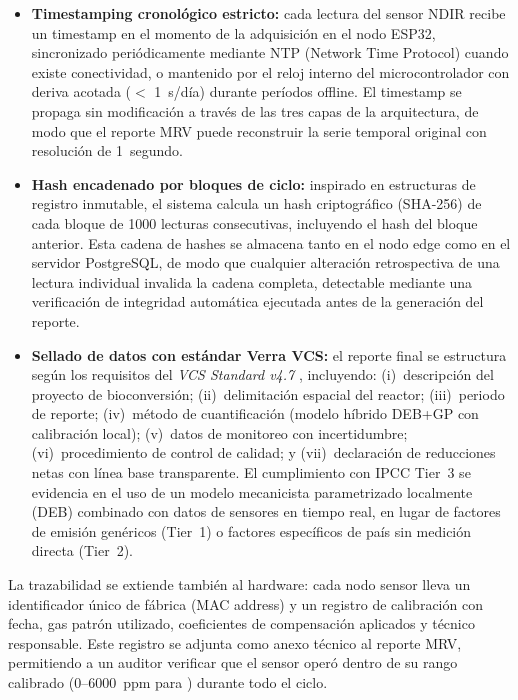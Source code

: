 \begin{itemize}
    \item \textbf{Timestamping cronológico estricto:} cada lectura del sensor NDIR recibe un timestamp en el momento de la adquisición en el nodo ESP32, sincronizado periódicamente mediante NTP (Network Time Protocol) cuando existe conectividad, o mantenido por el reloj interno del microcontrolador con deriva acotada ($<$ \num{1}~s/día) durante períodos offline. El timestamp se propaga sin modificación a través de las tres capas de la arquitectura, de modo que el reporte MRV puede reconstruir la serie temporal original con resolución de \num{1}~segundo.
    
    \item \textbf{Hash encadenado por bloques de ciclo:} inspirado en estructuras de registro inmutable, el sistema calcula un hash criptográfico (SHA-256) de cada bloque de \num{1000} lecturas consecutivas, incluyendo el hash del bloque anterior. Esta cadena de hashes se almacena tanto en el nodo edge como en el servidor PostgreSQL, de modo que cualquier alteración retrospectiva de una lectura individual invalida la cadena completa, detectable mediante una verificación de integridad automática ejecutada antes de la generación del reporte.
    
    \item \textbf{Sellado de datos con estándar Verra VCS:} el reporte final se estructura según los requisitos del \textit{VCS Standard v4.7} \parencite{verraVCSStandardV472024}, incluyendo: (i)~descripción del proyecto de bioconversión; (ii)~delimitación espacial del reactor; (iii)~periodo de reporte; (iv)~método de cuantificación (modelo híbrido DEB+GP con calibración local); (v)~datos de monitoreo con incertidumbre; (vi)~procedimiento de control de calidad; y (vii)~declaración de reducciones netas con línea base transparente. El cumplimiento con IPCC Tier~3 se evidencia en el uso de un modelo mecanicista parametrizado localmente (DEB) combinado con datos de sensores en tiempo real, en lugar de factores de emisión genéricos (Tier~1) o factores específicos de país sin medición directa (Tier~2).
\end{itemize}

La trazabilidad se extiende también al hardware: cada nodo sensor lleva un identificador único de fábrica (MAC address) y un registro de calibración con fecha, gas patrón utilizado, coeficientes de compensación aplicados y técnico responsable. Este registro se adjunta como anexo técnico al reporte MRV, permitiendo a un auditor verificar que el sensor operó dentro de su rango calibrado (\num{0}--\num{6000}~ppm para ) durante todo el ciclo.

